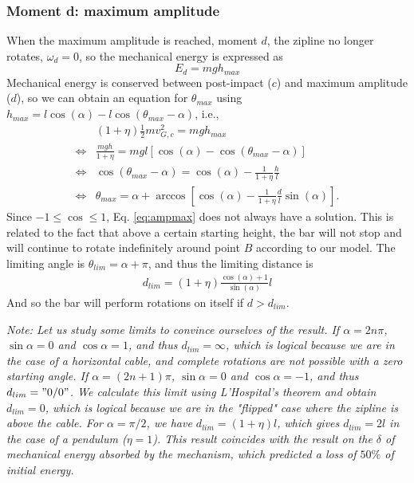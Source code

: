 \documentclass[11pt,a4paper]{exam}
\newcommand{\noteACDH}[1]{\textit{Note: #1}}
\begin{document}
\begin{parts}
    \subsubsection*{Moment d: maximum amplitude}
    When the maximum amplitude is reached, moment $d$, the zipline no longer rotates, $\omega_{d}=0$, so the mechanical energy is expressed as
    \begin{equation}
        E_{d} = mgh_{max}
    \end{equation}
    Mechanical energy is conserved between post-impact ($c$) and maximum amplitude ($d$), so we can obtain an equation for $\theta_{max}$ using $h_{max}=l \cos(\alpha)-l\cos(\theta_{max}-\alpha)$, i.e.,
    \begin{align}
        &(1+\eta)\frac{1}{2}mv_{G,c}^2 = mgh_{max} \nonumber\\
        \Leftrightarrow&\frac{mgh}{1+\eta} =mg l [\cos(\alpha)-\cos(\theta_{max}-\alpha)] \nonumber\\
        \Leftrightarrow&\cos(\theta_{max}-\alpha) = \cos(\alpha) - \frac{1}{1+\eta}\frac{h}{l}\nonumber\\
        \Leftrightarrow&\theta_{max}=\alpha+\arccos\left[\cos(\alpha) - \frac{1}{1+\eta}\frac{d}{l}\sin(\alpha)\right].
        \label{eq:ampmax}
    \end{align}
    Since $-1\leq \cos \leq 1$, Eq. \eqref{eq:ampmax} does not always have a solution.
    This is related to the fact that above a certain starting height, the bar will not stop and will continue to rotate indefinitely around point $B$ according to our model.
    The limiting angle is $\theta_{lim}=\alpha+\pi$, and thus the limiting distance is
    \begin{align}
        d_{lim} = (1+\eta) \frac{\cos(\alpha) + 1}{\sin(\alpha)}l
        \label{eq:hlim}
    \end{align}
    And so the bar will perform rotations on itself if $d>d_{lim}$.
    
    
    \noteACDH{Let us study some limits to convince ourselves of the result.
    If $\alpha=2n\pi$, $\sin\alpha=0$ and $\cos\alpha=1$, and thus $d_{lim}=\infty$, which is logical because we are in the case of a horizontal cable, and complete rotations are not possible with a zero starting angle.
    If $\alpha=(2n+1)\pi$, $\sin\alpha=0$ and $\cos\alpha=-1$, and thus $d_{lim}="0/0"$.
    We calculate this limit using L'Hospital's theorem and obtain $d_{lim}=0$, which is logical because we are in the "flipped" case where the zipline is above the cable.
    For $\alpha =\pi/2$, we have $d_{lim}=(1+\eta)l$, which gives $d_{lim}=2l$ in the case of a pendulum ($\eta = 1$). 
    This result coincides with the result on the $\delta$ of mechanical energy absorbed by the mechanism, which predicted a loss of $50\%$ of initial energy. }

\end{parts}
\end{document}
